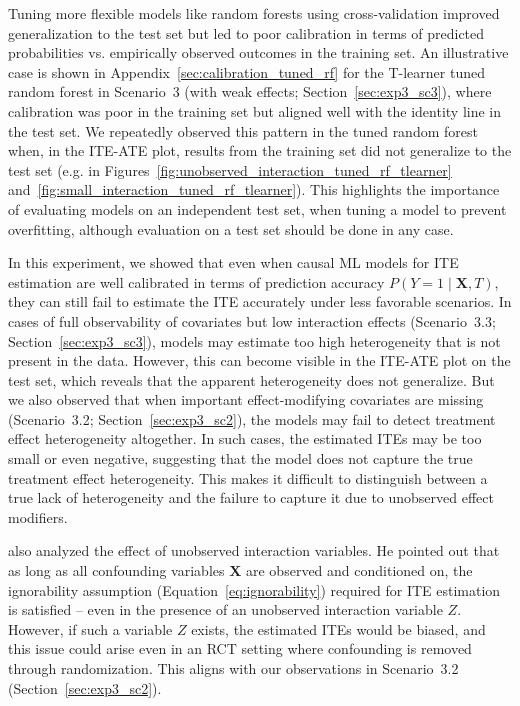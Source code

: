 Tuning more flexible models like random forests using cross-validation improved generalization to the test set but led to poor calibration in terms of predicted probabilities vs. empirically observed outcomes in the training set. An illustrative case is shown in Appendix~\ref{sec:calibration_tuned_rf} for the T-learner tuned random forest in Scenario~3 (with weak effects; Section~\ref{sec:exp3_sc3}), where calibration was poor in the training set but aligned well with the identity line in the test set. We repeatedly observed this pattern in the tuned random forest when, in the ITE-ATE plot, results from the training set did not generalize to the test set (e.g. in Figures~\ref{fig:unobserved_interaction_tuned_rf_tlearner} and~\ref{fig:small_interaction_tuned_rf_tlearner}). This highlights the importance of evaluating models on an independent test set, when tuning a model to prevent overfitting, although evaluation on a test set should be done in any case.

\medskip

In this experiment, we showed that even when causal ML models for ITE estimation are well calibrated in terms of prediction accuracy $P(Y = 1 \mid \mathbf{X}, T)$, they can still fail to estimate the ITE accurately under less favorable scenarios. In cases of full observability of covariates but low interaction effects (Scenario~3.3; Section~\ref{sec:exp3_sc3}), models may estimate too high heterogeneity that is not present in the data. However, this can become visible in the ITE-ATE plot on the test set, which reveals that the apparent heterogeneity does not generalize. 
But we also observed that when important effect-modifying covariates are missing (Scenario~3.2; Section~\ref{sec:exp3_sc2}), the models may fail to detect treatment effect heterogeneity altogether. In such cases, the estimated ITEs may be too small or even negative, suggesting that the model does not capture the true treatment effect heterogeneity. This makes it difficult to distinguish between a true lack of heterogeneity and the failure to capture it due to unobserved effect modifiers.


\citet{vegetabile2021} also analyzed the effect of unobserved interaction variables. He pointed out that as long as all confounding variables $\mathbf{X}$ are observed and conditioned on, the ignorability assumption (Equation~\ref{eq:ignorability}) required for ITE estimation is satisfied -- even in the presence of an unobserved interaction variable $Z$. However, if such a variable $Z$ exists, the estimated ITEs would be biased, and this issue could arise even in an RCT setting where confounding is removed through randomization. This aligns with our observations in Scenario~3.2 (Section~\ref{sec:exp3_sc2}).


